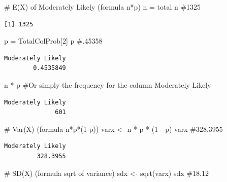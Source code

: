 \documentclass[
  letterpaper,
  DIV=11,
  numbers=noendperiod]{scrreprt}
\newenvironment{Shaded}{\begin{snugshade}}{\end{snugshade}}
\newcommand{\CommentTok}[1]{\textcolor[rgb]{0.37,0.37,0.37}{#1}}
\newcommand{\DecValTok}[1]{\textcolor[rgb]{0.68,0.00,0.00}{#1}}
\newcommand{\FunctionTok}[1]{\textcolor[rgb]{0.28,0.35,0.67}{#1}}
\newcommand{\NormalTok}[1]{\textcolor[rgb]{0.00,0.23,0.31}{#1}}
\newcommand{\OtherTok}[1]{\textcolor[rgb]{0.00,0.23,0.31}{#1}}
\newcommand{\SpecialCharTok}[1]{\textcolor[rgb]{0.37,0.37,0.37}{#1}}
\begin{document}
\begin{Shaded}
\begin{Highlighting}[]
\CommentTok{\# E(X) of Moderately Likely (formula n*p)}
\NormalTok{n }\OtherTok{=}\NormalTok{ total}
\NormalTok{n  }\CommentTok{\#1325}
\end{Highlighting}
\end{Shaded}

\begin{verbatim}
[1] 1325
\end{verbatim}

\begin{Shaded}
\begin{Highlighting}[]
\NormalTok{p }\OtherTok{=}\NormalTok{ TotalColProb[}\DecValTok{2}\NormalTok{]}
\NormalTok{p  }\CommentTok{\#.45358}
\end{Highlighting}
\end{Shaded}

\begin{verbatim}
Moderately Likely 
        0.4535849 
\end{verbatim}

\begin{Shaded}
\begin{Highlighting}[]
\NormalTok{n }\SpecialCharTok{*}\NormalTok{ p  }\CommentTok{\#Or simply the frequency for the column Moderately Likely}
\end{Highlighting}
\end{Shaded}

\begin{verbatim}
Moderately Likely 
              601 
\end{verbatim}

\begin{Shaded}
\begin{Highlighting}[]
\CommentTok{\# Var(X) (formula n*p*(1{-}p))}
\NormalTok{varx }\OtherTok{\textless{}{-}}\NormalTok{ n }\SpecialCharTok{*}\NormalTok{ p }\SpecialCharTok{*}\NormalTok{ (}\DecValTok{1} \SpecialCharTok{{-}}\NormalTok{ p)}
\NormalTok{varx  }\CommentTok{\#328.3955}
\end{Highlighting}
\end{Shaded}

\begin{verbatim}
Moderately Likely 
         328.3955 
\end{verbatim}

\begin{Shaded}
\begin{Highlighting}[]
\CommentTok{\# SD(X) (formula sqrt of variance)}
\NormalTok{sdx }\OtherTok{\textless{}{-}} \FunctionTok{sqrt}\NormalTok{(varx)}
\NormalTok{sdx  }\CommentTok{\#18.12}
\end{Highlighting}
\end{Shaded}
\end{document}
